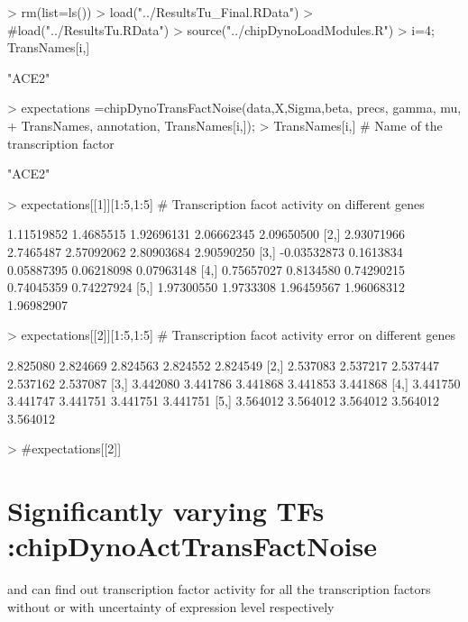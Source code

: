 \documentclass[11pt, a4paper, oneside]{article}
\begin{document}
\begin{Schunk}
\begin{Sinput}
> rm(list=ls())
> load("../ResultsTu_Final.RData")
> #load("../ResultsTu.RData")
> source("../chipDynoLoadModules.R")
> i=4; TransNames[i,]
\end{Sinput}
\begin{Soutput}
[1] "ACE2"
\end{Soutput}
\begin{Sinput}
> expectations =chipDynoTransFactNoise(data,X,Sigma,beta, precs, gamma, mu,
+                                      TransNames, annotation, TransNames[i,]);
> TransNames[i,] # Name of the transcription factor
\end{Sinput}
\begin{Soutput}
[1] "ACE2"
\end{Soutput}
\begin{Sinput}
> expectations[[1]][1:5,1:5] # Transcription facot activity on different genes
\end{Sinput}
\begin{Soutput}
            [,1]      [,2]       [,3]       [,4]       [,5]
[1,]  1.11519852 1.4685515 1.92696131 2.06662345 2.09650500
[2,]  2.93071966 2.7465487 2.57092062 2.80903684 2.90590250
[3,] -0.03532873 0.1613834 0.05887395 0.06218098 0.07963148
[4,]  0.75657027 0.8134580 0.74290215 0.74045359 0.74227924
[5,]  1.97300550 1.9733308 1.96459567 1.96068312 1.96982907
\end{Soutput}
\begin{Sinput}
> expectations[[2]][1:5,1:5] # Transcription facot activity error on different genes
\end{Sinput}
\begin{Soutput}
         [,1]     [,2]     [,3]     [,4]     [,5]
[1,] 2.825080 2.824669 2.824563 2.824552 2.824549
[2,] 2.537083 2.537217 2.537447 2.537162 2.537087
[3,] 3.442080 3.441786 3.441868 3.441853 3.441868
[4,] 3.441750 3.441747 3.441751 3.441751 3.441751
[5,] 3.564012 3.564012 3.564012 3.564012 3.564012
\end{Soutput}
\begin{Sinput}
> #expectations[[2]]
\end{Sinput}
\end{Schunk}


\section{Significantly varying TFs :chipDynoActTransFactNoise}
 and  can find out transcription factor activity for all the transcription factors without or with uncertainty of expression level respectively 
\end{document}
